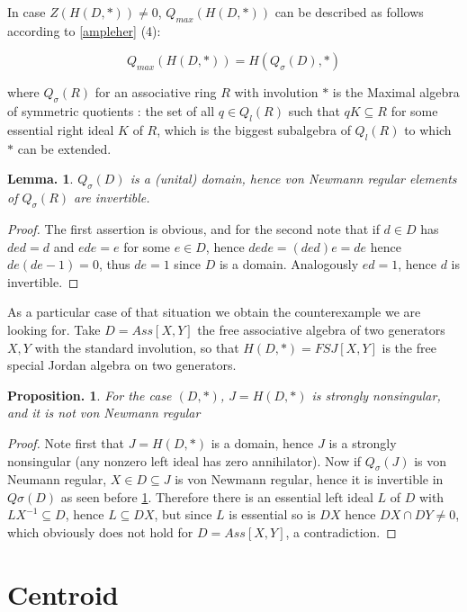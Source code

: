 \documentclass[a4paper,twoside,11pt]{article}
\theoremstyle{plain}
\theoremstyle{miestilo}
\newtheorem{proposicion}[subsection]{Proposition.}
\newtheorem{lema}[subsection]{Lemma.}
\theoremstyle{misnotas}
\begin{document}
In case $Z(H(D,\ast))\neq0$, $Q_{max}(H(D,\ast))$ can be described as follows according to \ref {ampleher} (4):

$$Q_{max}(H(D,\ast))=H(Q_{\sigma}(D),\ast)$$

where $Q_{\sigma}(R)$ for an associative ring $R$ with involution $\ast$ is the Maximal algebra of symmetric quotients \cite{lanning}: the set of all $q\in Q_l(R)$ such that $qK \subseteq R$ for some essential right ideal $K$ of $R$, which is the biggest subalgebra of $Q_l(R)$ to which $\ast$ can be extended.

\begin{lema} \label{regularisinvertible} $Q_{\sigma}(D)$ is a (unital) domain, hence von Newmann regular elements of $Q_{\sigma}(R)$ are invertible.\end{lema}

\begin{proof} The first assertion is obvious, and for the second note that if $d \in D$ has $ded=d$ and $ede=e$ for some $e \in D$, hence $dede=(ded)e=de$ hence $de(de-1)=0$, thus $de=1$ since $D$ is a domain. Analogously $ed=1$, hence $d$ is invertible. \end{proof}

As a particular case of that situation we obtain the counterexample we are looking for. Take $D=Ass[X,Y]$ the free associative algebra of two generators $X,Y$ with the standard involution, so that $H(D,\ast)=FSJ[X,Y]$ is the free special Jordan algebra on two generators.

\begin{proposicion} For the case $(D,\ast)$, $J=H(D,\ast)$ is strongly nonsingular, and it is not von Newmann regular\end{proposicion}

\begin{proof} Note first that  $J=H(D,\ast)$ is a domain, hence $J$ is a strongly nonsingular (any nonzero left ideal has zero annihilator). Now if $Q_{\sigma}(J)$ is von Neumann regular, $X \in D \subseteq J$ is von Newmann regular, hence it is invertible in $Q\sigma (D)$ as seen before \ref{regularisinvertible}. Therefore there is an essential left ideal $L$ of $D$ with $LX^{-1} \subseteq D$, hence $L \subseteq DX$, but since $L$ is essential so is $DX$ hence $DX \cap DY \neq 0$, which obviously does not hold for $D=Ass[X,Y]$, a contradiction. \end{proof}

\section{Centroid}
\end{document}
